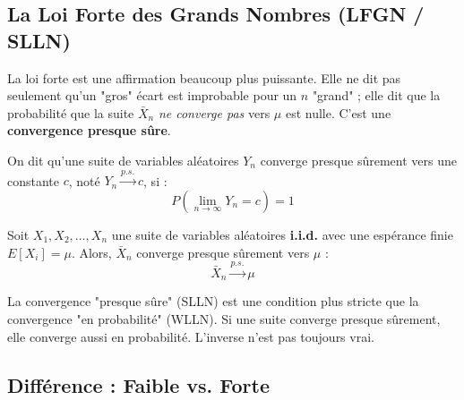 \subsection{La Loi Forte des Grands Nombres (LFGN / SLLN)}

La loi forte est une affirmation beaucoup plus puissante. Elle ne dit pas seulement qu'un "gros" écart est improbable pour un $n$ "grand" ; elle dit que la probabilité que la suite $\bar{X}_n$ \textit{ne converge pas} vers $\mu$ est nulle. C'est une \textbf{convergence presque sûre}.

\begin{definitionbox}
On dit qu'une suite de variables aléatoires $Y_n$ converge presque sûrement vers une constante $c$, noté $Y_n \xrightarrow{p.s.} c$, si :
$$P\left( \lim_{n \to \infty} Y_n = c \right) = 1$$
\end{definitionbox}

\begin{theorembox}
Soit $X_1, X_2, \dots, X_n$ une suite de variables aléatoires \textbf{i.i.d.} avec une espérance finie $E[X_i] = \mu$.
Alors, $\bar{X}_n$ converge presque sûrement vers $\mu$ :
$$\bar{X}_n \xrightarrow{p.s.} \mu$$
\end{theorembox}

\begin{remarquebox}
La convergence "presque sûre" (SLLN) est une condition plus stricte que la convergence "en probabilité" (WLLN). Si une suite converge presque sûrement, elle converge aussi en probabilité. L'inverse n'est pas toujours vrai.
\end{remarquebox}

\subsection{Différence : Faible vs. Forte}

